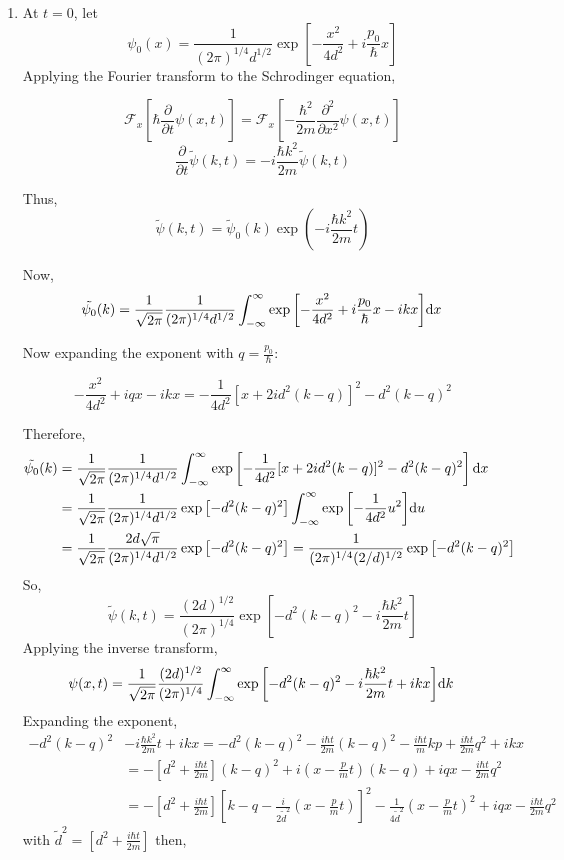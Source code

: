 \documentclass[12pt]{extarticle}
\begin{document}
\begin{enumerate}
\item At $t = 0$, let \[\psi_0(x) = \frac{1}{(2 \pi)^{1/4} d^{1/2}} \exp{\left[-\frac{x^2}{4 d^2} + i \frac{p_0}{\hbar} x \right]}\]
Applying the Fourier transform to the Schrodinger equation, 

\[ \mathcal{F}_x\left[ \hbar \frac{\partial}{\partial t} \psi(x, t) \right] = \mathcal{F}_x\left[ - \frac{\hbar^2}{2m} \frac{\partial^2}{\partial x^2} \psi(x,t) \right] \]
\[ \frac{\partial}{\partial t} \tilde{\psi}(k, t) = - i \frac{\hbar k^2}{2m} \tilde{\psi}(k,t) \]

Thus, \[ \tilde{\psi}(k, t) = \tilde{\psi}_0(k) \exp{\left( - i \frac{\hbar k^2}{2m} t \right)}\]


Now, 
\[\tilde{\psi_0}(k) = \frac{1}{\sqrt{2 \pi}} \frac{1}{(2 \pi)^{1/4} d^{1/2}} \int_{-\infty}^{\infty} \exp{\left[-\frac{x^2}{4 d^2} + i \frac{p_0}{\hbar} x - i k x \right]} \mathrm{d}x \: \]

Now expanding the exponent with $q = \frac{p_0}{\hbar}$:

\[-\frac{x^2}{4 d^2} + i q x - i k x  = -\frac{1}{4 d^2} [x + 2i d^2 (k - q)]^2 - d^2(k-q)^2 \]

Therefore, 
\begin{align*}
\tilde{\psi_0}(k) &= \frac{1}{\sqrt{2 \pi}} \frac{1}{(2 \pi)^{1/4} d^{1/2}} \int_{-\infty}^{\infty} \exp{\left[-\frac{1}{4 d^2} [x + 2i d^2 (k - q)]^2 - d^2(k-q)^2 \right]  \mathrm{d}x \:} \\
&= \frac{1}{\sqrt{2 \pi}} \frac{1}{(2 \pi)^{1/4} d^{1/2}} \exp{\left[- d^2(k-q)^2 \right]} \int_{-\infty}^{\infty} \exp{\left[-\frac{1}{4 d^2} u^2 \right]} \mathrm{d}u \: \\ &= \frac{1}{\sqrt{2 \pi}} \frac{2 d \sqrt{\pi}}{(2 \pi)^{1/4} d^{1/2}} \exp{\left[- d^2(k-q)^2 \right]} = \frac{1}{(2 \pi)^{1/4} (2/d)^{1/2}} \exp{\left[- d^2(k-q)^2 \right]}
\end{align*}
So, \[ \tilde{\psi}(k, t) = \frac{(2d)^{1/2}}{(2 \pi)^{1/4}} \exp{\left[ - d^2(k-q)^2 - i \frac{\hbar k^2}{2m} t \right]}\]
Applying the inverse transform, 
\[\psi(x, t) =  \frac{1}{\sqrt{2 \pi}} \frac{(2d)^{1/2}}{(2 \pi)^{1/4}} \int_{-\infty}^{\infty} \exp{\left[ - d^2(k-q)^2 - i \frac{\hbar k^2}{2m} t + ikx \right]} \mathrm{d}k \:  \]
Expanding the exponent, 
\begin{align*}
- d^2(k-q)^2 &- i \frac{\hbar k^2}{2m} t + ikx = - d^2(k - q)^2 -  \frac{i \hbar t}{2m} (k - q)^2 -  \frac{i \hbar t}{m} kp +  \frac{i \hbar t}{2m} q^2 + ikx \\ & = -\left[d^2 + \frac{i \hbar t}{2m} \right] (k - q)^2 + i \left(x - \frac{p}{m} t \right) (k - q) + iqx - \frac{i \hbar t}{2m} q^2  \\ &= -\left[d^2 + \frac{i \hbar t}{2m} \right] \left[k - q - \frac{i}{2 \tilde{d}^2} \left(x - \frac{p}{m} t \right) \right]^2 - \frac{1}{4 \tilde{d}^2} \left(x - \frac{p}{m} t \right)^2 + iqx - \frac{i \hbar t}{2m} q^2
\end{align*}
with $\tilde{d}^2 = \left[d^2 + \frac{i \hbar t}{2m} \right]$ then, 


\end{enumerate}
\end{document}
